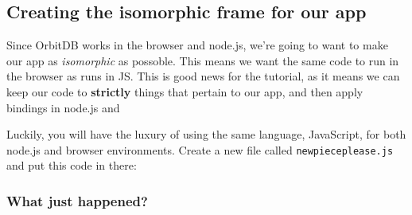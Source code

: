\subsection{Creating the isomorphic frame for our
app}\label{creating-the-isomorphic-frame-for-our-app}

Since OrbitDB works in the browser and node.js, we're going to want to
make our app as \emph{isomorphic} as possoble. This means we want the
same code to run in the browser as runs in JS. This is good news for the
tutorial, as it means we can keep our code to \textbf{strictly} things
that pertain to our app, and then apply bindings in node.js and

Luckily, you will have the luxury of using the same language,
JavaScript, for both node.js and browser environments. Create a new file
called \texttt{newpieceplease.js} and put this code in there:

\begin{Shaded}
\begin{Highlighting}[]
 \OperatorTok{\{}
  \OperatorTok{=} \NormalTok{(}\NormalTok{)}
  \OperatorTok{=} \NormalTok{(}\NormalTok{)}
\OperatorTok{\}} \OperatorTok{\{\}}

 \NormalTok{() }\OperatorTok{\{}
  \OperatorTok{,}\OperatorTok{\{} \OperatorTok{\}}
\OperatorTok{\}}

 \OperatorTok{\{}
   \OperatorTok{=}\OperatorTok{=}  \OperatorTok{,}
\OperatorTok{\}} \OperatorTok{\{}
   \OperatorTok{=}  \NormalTok{(}\OperatorTok{,} \NormalTok{)}
\OperatorTok{\}}
\end{Highlighting}
\end{Shaded}

\subsubsection{What just happened?}\label{what-just-happened-2}

